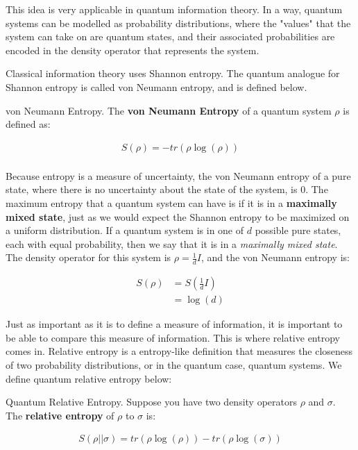 This idea is very applicable in quantum information theory. In a way, quantum systems can be modelled as probability distributions, where the "values" that the system can take on are quantum states, and their associated probabilities are encoded in the density operator that represents the system.

Classical information theory uses Shannon entropy. The quantum analogue for Shannon entropy is called von Neumann entropy, and is defined below.

\begin{definition}{von Neumann Entropy.}
    The \textbf{von Neumann Entropy} of a quantum system $\rho$ is defined as:
    
    \begin{align*}
        S(\rho) = -tr(\rho \log(\rho)) \\
    \end{align*}
\end{definition}

Because entropy is a measure of uncertainty, the von Neumann entropy of a pure state, where there is no uncertainty about the state of the system, is 0. The maximum entropy that a quantum system can have is if it is in a \textbf{maximally mixed state}, just as we would expect the Shannon entropy to be maximized on a uniform distribution. If a quantum system is in one of $d$ possible pure states, each with equal probability, then we say that it is in a \textit{maximally mixed state}. The density operator for this system is $\rho = \tfrac{1}{d}I$, and the von Neumann entropy is:

\begin{align*}
    S(\rho) &= S(\tfrac{1}{d}I) \\ 
    &= \log(d)
\end{align*}

Just as important as it is to define a measure of information, it is important to be able to compare this measure of information. This is where relative entropy comes in. Relative entropy is a entropy-like definition that measures the closeness of two probability distributions, or in the quantum case, quantum systems. We define quantum relative entropy below:

\begin{definition}{Quantum Relative Entropy.}
    Suppose you have two density operators $\rho$ and $\sigma$. The \textbf{relative entropy} of $\rho$ to $\sigma$ is:
    
    \begin{align*}
        S(\rho||\sigma) = tr(\rho \log(\rho)) - tr(\rho \log (\sigma)) \\
    \end{align*}
\end{definition}

